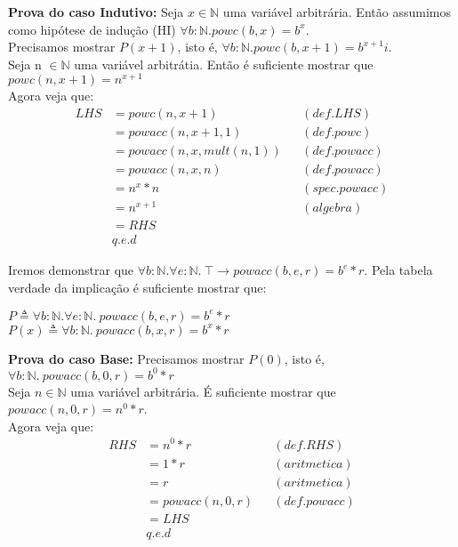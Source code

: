\documentclass{article}
\begin{document}
\noindent\textbf{Prova do caso Indutivo:}
Seja $x \in \mathbb{N}$ uma variável arbitrária. Então assumimos como hipótese de indução (HI)
$\forall b:\mathbb{N}. powc(b, x) = b^x$.\\
Precisamos mostrar $P(x+1)$, isto é, $\forall b:\mathbb{N}. powc(b, x+1) = b^{x+1}i$.\\
Seja n $\in \mathbb{N}$ uma variável arbitrátia. Então é suficiente mostrar que $powc(n, x+1) = n^{x+1}$\\
Agora veja que:
\begin{align*}
LHS &= powc(n, x+1) && (def. LHS)\\
&= powacc(n, x+1, 1) && (def. powc)\\
&= powacc(n, x, mult(n, 1)) && (def. powacc)\\
&= powacc(n, x, n) && (def. powacc)\\
&= n^x * n && (spec. powacc)\\
&= n^{x+1} && (algebra)\\
&= RHS\\
& q.e.d
\end{align*}


\noindent Iremos demonstrar que
$\forall b:\mathbb{N}. \forall e:\mathbb{N}.\: \top \rightarrow powacc(b, e, r) = b^e * r$.
Pela tabela verdade da implicação é suficiente mostrar que:\\
\begin{center}
$P \triangleq \forall b:\mathbb{N}. \forall e:\mathbb{N}.\: powacc(b, e, r) = b^e * r$\\
$P(x) \triangleq \forall b:\mathbb{N}.\: powacc(b, x, r) = b^x * r$\\
\end{center}

\noindent\textbf{Prova do caso Base:}
Precisamos mostrar $P(0)$, isto é, $\forall b:\mathbb{N}.\: powacc(b, 0, r) = b^0 * r$\\
Seja $n \in \mathbb{N}$ uma variável arbitrária. É suficiente mostrar que $powacc(n, 0, r) = n^0 * r$.\\
Agora veja que:
\begin{align*}
RHS &= n^0 * r && (def. RHS)\\
&= 1 * r && (aritmetica)\\
&= r && (aritmetica)\\
&= powacc(n, 0, r) && (def. powacc)\\
&= LHS\\
& q.e.d
\end{align*}
\end{document}
